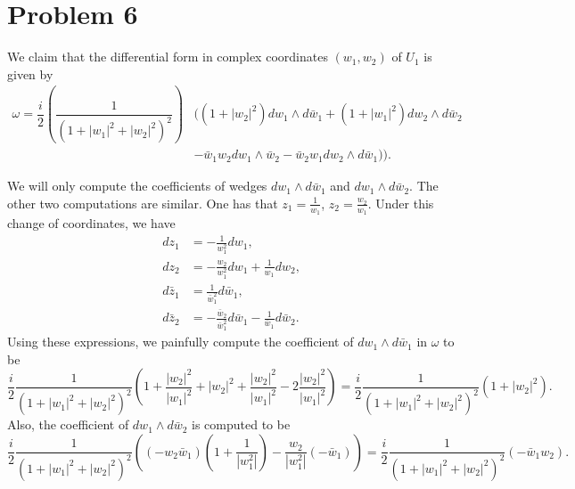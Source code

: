 \documentclass{amsart}
\numberwithin{equation}{section}
\theoremstyle{plain}
\theoremstyle{definition}
\theoremstyle{remark}
\renewcommand{\_}[2]{\underbrace{#1}_{#2}}
\renewcommand{\^}[2]{\overbrace{#1}_{#2}}
\begin{document}
\section*{Problem 6}
We claim that the differential form in complex coordinates $(w_1,w_2)$ of $U_1$ is given by
\begin{align*}                                                                                                                                                                                                                                              
\omega = \dfrac{i}{2} \left( \dfrac{1}{(1 + |w_1|^2 + |w_2|^2)^2} \right) &\Big((1 + |w_2|^2)dw_1 \wedge d\bar{w}_1 + (1 + |w_1|^2)dw_2 \wedge d\bar{w}_2 \\                                                                                                           
&- \bar{w}_1w_2 dw_1 \wedge \bar{w}_2 - \bar{w}_2 w_1 dw_2 \wedge d\bar{w}_1)\Big).                                                                                                                                                                           
\end{align*}

We will only compute the coefficients of wedges $dw_1 \wedge d\bar w_1$ and $dw_1\wedge d\bar w_2$. The other two computations are similar. One has that $z_1 = \frac 1{w_1}$, $z_2 = \frac{w_2}{w_1}$. Under this change of coordinates, we have
\begin{align*}
  dz_1 & = -\frac1{w_1^2} dw_1,\\
  dz_2 &= -\frac{w_2}{w_1^2} dw_1 + \frac1{w_1}dw_2,\\
  d\bar z_1 &= \frac1{\bar w_1^2} d\bar w_1,\\
  d\bar z_2 &= -\frac{\bar w_2}{\bar w_1^2} d\bar w_1 - \frac1{\bar w_1}d\bar w_2.
\end{align*}
Using these expressions, we painfully compute the coefficient of $dw_1 \wedge d\bar w_1$ in $\omega$ to be \[\frac i2 \frac{1}{(1+|w_1|^2+|w_2|^2)^2}\left(1 + \frac{|w_2|^2}{|w_1|^2} + |w_2|^2 + \frac{|w_2|^2}{|w_1|^2} - 2 \frac{|w_2|^2}{|w_1|^2}\right) = \frac i2 \frac{1}{(1+|w_1|^2+|w_2|^2)^2} \left(1 + |w_2|^2\right).\]
Also, the coefficient of $dw_1 \wedge d\bar w_2$ is computed to be \[\frac i2 \frac{1}{(1+|w_1|^2+|w_2|^2)^2}\left((-w_2\bar w_1)\left(1+\frac{1}{|w_1^2|}\right) - \frac{w_2}{|w_1^2|} (-\bar w_1)\right) = \frac i2 \frac{1}{(1+|w_1|^2+|w_2|^2)^2}(-\bar w_1w_2).\]
\end{document}
